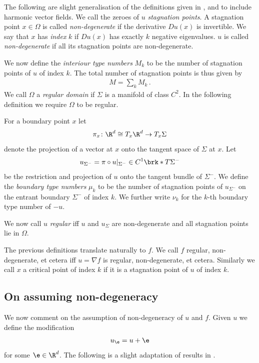 The following are slight generalisation of the definitions given in \cite[p.138f]{Shelton1980}, \cite[§5]{Morse1969} and \cite[p.282f]{Morse1970}
to include harmonic vector fields.
We call the zeroes of $u$ \emph{stagnation points}. A stagnation point $x\in\Omega$ is called
\emph{non-degenerate} if the derivative $Du(x)$ is invertible. We say that $x$ has \emph{index} $k$
if $Du(x)$ has exactly $k$ negative eigenvalues. $u$ is called \emph{non-degenerate} if all its stagnation points
are non-degenerate.

We now define the \emph{interiour type numbers} $M_k$
to be the number of stagnation points of $u$ of index $k$.
The total number of stagnation points is thus given by
\begin{align*}
  M=\sum_kM_k\,.
\end{align*}
We call $\Omega$ a \emph{regular domain} if $\Sigma$ is a manifold of class $C^2$.
In the following definition we require $\Omega$ to be regular.
\begin{definition}
  For a boundary point $x$ let $$\pi_x\colon \R^d\cong T_x\R^d\to T_x\Sigma$$ denote the projection of a
  vector at $x$ onto the tangent space of $\Sigma$ at $x$.
  Let $$u_{\Sigma^-}=\pi\circ u\vert_{\Sigma^-}\in C^1\brk*{T\Sigma^-}$$ be the restriction and projection of $u$ onto the tangent bundle of $\Sigma^-$.
  We define the \emph{boundary type numbers} $\mu_k$ to be
  the number of stagnation points of $u_{\Sigma^-}$ on the entrant boundary
  $\Sigma^-$ of index $k$.
  We further write $\nu_k$ for the $k$-th boundary type number of $-u$.
\end{definition}

We now call $u$ \emph{regular} iff $u$ and $u_\Sigma$ are non-degenerate and all stagnation points lie in $\Omega$.

The previous definitions translate naturally to $f$.
We call $f$ regular, non-degenerate, et cetera iff $u=\nabla f$ is regular, non-degenerate, et cetera.
Similarly we call $x$ a critical point of index $k$ if it is a stagnation point of $u$ of index $k$.


\subsection{On assuming non-degeneracy}

We now comment on the assumption of non-degeneracy of $u$ and $f$.
Given $u$ we define the modification
\begin{align*}
  u_\e=u+\e
\end{align*}
for some $\e\in\R^d$. The following is a slight adaptation of results in \cite[§2]{Morse1970}.

